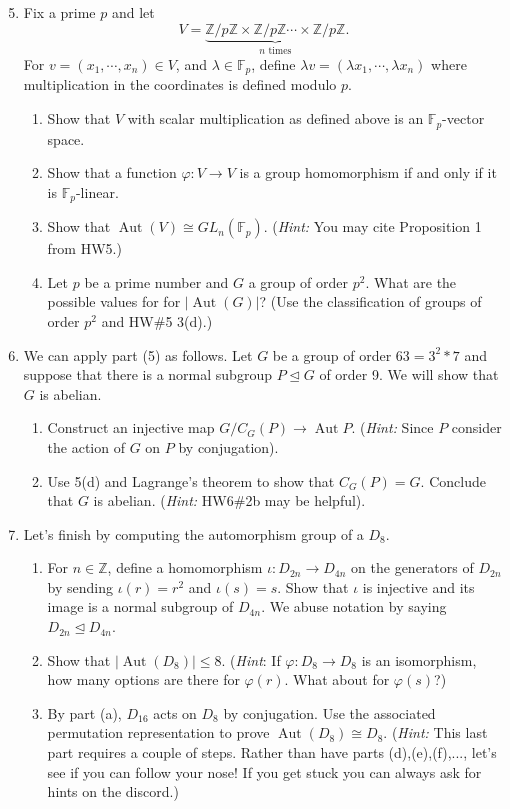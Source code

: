\documentclass[11pt]{article}
\newcommand{\Aut}{\operatorname{Aut}}
\newcommand{\bF}{\mathbb{F}}
\newcommand{\bZ}{\mathbb{Z}}
\begin{document}
\begin{enumerate}
  \setcounter{enumi}{4}
  \item Fix a prime $p$ and let
  \[V = \underbrace{\bZ/p\bZ\times\bZ/p\bZ\cdots\times\bZ/p\bZ}_{n\text{ times}}.\]
  For $v = (x_1,\cdots,x_n)\in V$, and $\lambda\in\bF_p$, define $\lambda v = (\lambda x_1,\cdots,\lambda x_n)$ where multiplication in the coordinates is defined modulo $p$.
  \begin{enumerate}
    \item Show that $V$ with scalar multiplication as defined above is an $\bF_p$-vector space.
    \item Show that a function $\varphi:V\to V$ is a group homomorphism if and only if it is $\bF_p$-linear.
    \item Show that $\Aut(V)\cong GL_n(\bF_p)$.  (\textit{Hint:} You may cite Proposition 1 from HW5.)
    \item Let $p$ be a prime number and $G$ a group of order $p^2$.  What are the possible values for for $|\Aut(G)|$?  (Use the classification of groups of order $p^2$ and HW\#5 3(d).)
  \end{enumerate}
  \item We can apply part (5) as follows.  Let $G$ be a group of order $63 = 3^2*7$ and suppose that there is a normal subgroup $P\unlhd G$ of order 9.  We will show that $G$ is abelian.
  \begin{enumerate}
    \item Construct an injective map $G/C_G(P)\to\Aut P$.  (\textit{Hint:} Since $P$ consider the action of $G$ on $P$ by conjugation).
    \item Use 5(d) and Lagrange's theorem to show that $C_G(P) = G$.  Conclude that $G$ is abelian.  (\textit{Hint:} HW6\#2b may be helpful).
  \end{enumerate}
  \item Let's finish by computing the automorphism group of a $D_8$.
  \begin{enumerate}
    \item For $n\in\bZ$, define a homomorphism $\iota:D_{2n}\to D_{4n}$ on the generators of $D_{2n}$ by sending $\iota(r)=r^2$ and $\iota(s)=s$.  Show that $\iota$ is injective and its image is a normal subgroup of $D_{4n}$.  We abuse notation by saying $D_{2n}\unlhd D_{4n}$.
    \item Show that $|\Aut(D_8)|\le 8$.  (\textit{Hint}: If $\varphi:D_8\to D_8$ is an isomorphism, how many options are there for $\varphi(r)$.  What about for $\varphi(s)$?)
    \item By part (a), $D_{16}$ acts on $D_8$ by conjugation.  Use the associated permutation representation to prove $\Aut(D_8) \cong D_8$.  (\textit{Hint:} This last part requires a couple of steps.  Rather than have parts (d),(e),(f),..., let's see if you can follow your nose!  If you get stuck you can always ask for hints on the discord.)
  \end{enumerate}
\end{enumerate}
\end{document}

